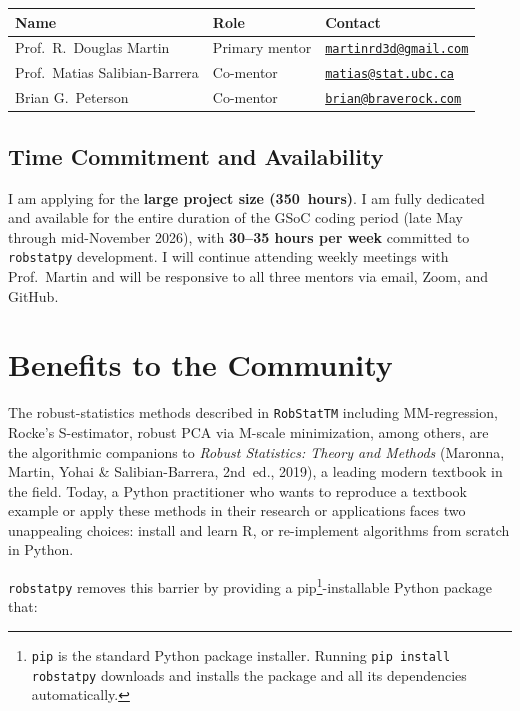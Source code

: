 \documentclass[11pt, a4paper]{article}
\begin{document}
\renewcommand{\arraystretch}{1.2}
\begin{tabularx}{\linewidth}{@{} l l X @{}}
  \toprule
  \textbf{Name} & \textbf{Role} & \textbf{Contact} \\
  \midrule
  Prof.\ R.\ Douglas Martin
    & Primary mentor
    & \href{mailto:martinrd3d@gmail.com}{\texttt{martinrd3d@gmail.com}} \\
  Prof.\ Matias Salibian-Barrera
    & Co-mentor
    & \href{mailto:matias@stat.ubc.ca}{\texttt{matias@stat.ubc.ca}} \\
  Brian G.\ Peterson
    & Co-mentor
    & \href{mailto:brian@braverock.com}{\texttt{brian@braverock.com}} \\
  \bottomrule
\end{tabularx}
\renewcommand{\arraystretch}{1}

\subsection{Time Commitment and Availability}

I am applying for the \textbf{large project size (350~hours)}.
I am fully dedicated and available for the entire duration of the GSoC
coding period (late May through mid-November 2026), with
\textbf{30--35 hours per week} committed to \texttt{robstatpy}
development.
I will continue attending weekly meetings with Prof.\ Martin and will be
responsive to all three mentors via email, Zoom, and GitHub.

\section{Benefits to the Community}

The robust-statistics methods described in \texttt{RobStatTM}
including MM-regression, Rocke's S-estimator, robust PCA via M-scale minimization, among others,
are the algorithmic companions to \emph{Robust Statistics: Theory and
Methods} (Maronna, Martin, Yohai \& Salibian-Barrera, 2nd~ed., 2019),
a leading modern textbook in the field.
Today, a Python practitioner who wants to reproduce a textbook example or
apply these methods in their research or applications faces two unappealing choices:
install and learn R, or re-implement algorithms from scratch in Python.

\texttt{robstatpy} removes this barrier by providing a
pip\footnote{\texttt{pip} is the standard Python package installer.
Running \texttt{pip install robstatpy} downloads and installs the
package and all its dependencies automatically.}-installable
Python package that:
\end{document}
